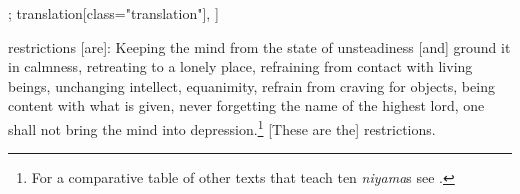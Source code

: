 \begin{alignment}[
  texts=edition[class="edition"];
  translation[class="translation"],
  ]
\begin{translation}
\begin{tlate}[p31_01]
[The] restrictions [are]: Keeping the mind from the state of unsteadiness [and] ground it in calmness, retreating to a lonely place, refraining from contact with living beings, unchanging intellect, equanimity, refrain from craving for objects, being content with what is given, never forgetting the name of the highest lord, one shall not bring the mind into depression.\footnote{For a comparative table of other texts that teach ten \textit{niyama}s see \citeauthor[2023:196]{shivayogapradipika}.} [These are the] restrictions. 
\flushpage 
\end{tlate}
\end{translation}
\end{alignment}
\pagebreak %
